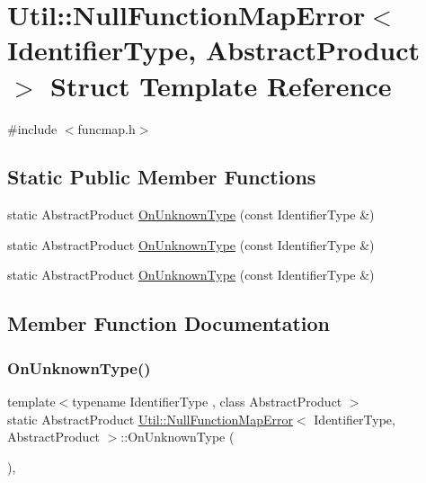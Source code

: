 \hypertarget{structUtil_1_1NullFunctionMapError}{}\section{Util\+:\+:Null\+Function\+Map\+Error$<$ Identifier\+Type, Abstract\+Product $>$ Struct Template Reference}
\label{structUtil_1_1NullFunctionMapError}


{\ttfamily \#include $<$funcmap.\+h$>$}

\subsection*{Static Public Member Functions}
\begin{DoxyCompactItemize}
\item 
static Abstract\+Product \mbox{\hyperlink{structUtil_1_1NullFunctionMapError_afde570791232ed1469bcba0fdffcd8c8}{On\+Unknown\+Type}} (const Identifier\+Type \&)
\item 
static Abstract\+Product \mbox{\hyperlink{structUtil_1_1NullFunctionMapError_afde570791232ed1469bcba0fdffcd8c8}{On\+Unknown\+Type}} (const Identifier\+Type \&)
\item 
static Abstract\+Product \mbox{\hyperlink{structUtil_1_1NullFunctionMapError_afde570791232ed1469bcba0fdffcd8c8}{On\+Unknown\+Type}} (const Identifier\+Type \&)
\end{DoxyCompactItemize}


\subsection{Member Function Documentation}
\mbox{\label{structUtil_1_1NullFunctionMapError_afde570791232ed1469bcba0fdffcd8c8}} 
\subsubsection{\texorpdfstring{OnUnknownType()}{OnUnknownType()}\hspace{0.1cm}{\footnotesize\ttfamily [1/3]}}
{\footnotesize\ttfamily template$<$typename Identifier\+Type , class Abstract\+Product $>$ \\
static Abstract\+Product \mbox{\hyperlink{structUtil_1_1NullFunctionMapError}{Util\+::\+Null\+Function\+Map\+Error}}$<$ Identifier\+Type, Abstract\+Product $>$\+::On\+Unknown\+Type (\begin{DoxyParamCaption}\item[{const Identifier\+Type \&}]{ }\end{DoxyParamCaption})\hspace{0.3cm}{\ttfamily [inline]}, {\ttfamily [static]}}

